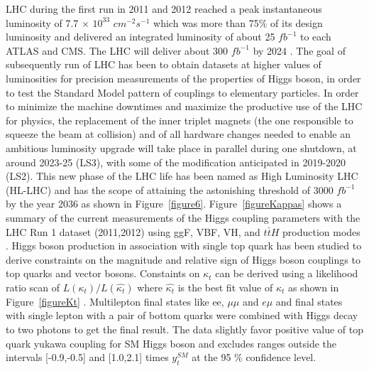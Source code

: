 \documentclass[final,3p]{CSP}
\begin{document}
LHC during the first run in 2011 and 2012 reached a peak instantaneous luminosity of 7.7 $\times$ $10^{33}$ $cm^{-2}s^{-1}$ which was more than 75$\%$ of its design luminosity and delivered an integrated luminosity of about 25 $fb^{-1}$ to each ATLAS and CMS.
 The LHC will deliver about 300 $fb^{-1}$ by 2024 \cite{collaborations2019report}.
The goal of subsequently run of LHC has been to obtain datasets at higher values of luminosities for precision measurements of the properties of Higgs boson, in order to test the Standard Model pattern of couplings to elementary particles.
In order to minimize the machine downtimes and maximize the productive use of the LHC for physics, the replacement of the inner triplet magnets (the one responsible to squeeze the beam at collision) and  of  all  hardware  changes  needed  to  enable  an  ambitious  luminosity  upgrade  will  take  place in parallel during one shutdown, at around 2023-25 (LS3), with some of the modification anticipated in 2019-2020 (LS2).
This new phase of the LHC life has been named as High Luminosity LHC (HL-LHC) and has the scope of attaining the astonishing threshold of 3000 $fb^{-1}$ by the year 2036 as shown in Figure~\ref{figure6}.
Figure~\ref{figureKappas} shows a summary of the current measurements of the Higgs coupling parameters with the LHC Run 1 dataset (2011,2012)  using ggF, VBF, VH, and ${t\bar{t}H}$ production modes \cite{Tanabashi:2018oca}.
Higgs boson production in association with single top quark has been studied to derive constraints on the magnitude and relative sign of Higgs boson couplings to top quarks and vector bosons.
Constaints on $\kappa_t$ can be derived using a likelihood ratio scan of $L(\kappa_t)/L(\hat{\kappa_t})$ where $\hat{\kappa_t}$ is the best fit value of $\kappa_t$ as shown in Figure~\ref{figureKt} \cite{Sirunyan:2018lzm}.
Multilepton final states like ee, $\mu\mu$ and $e\mu$ and final states with single lepton with a pair of bottom quarks were combined with Higgs decay to two photons to get the final result. The data slightly favor positive value of top quark yukawa coupling for SM Higgs boson and excludes ranges outside the intervals [-0.9,-0.5] and [1.0,2.1] times $y^{SM}_t$ at the 95 $\%$ confidence level.
\newpage
\end{document}
